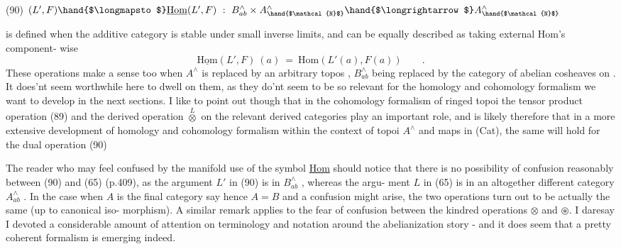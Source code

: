 
(90) \qquad $(L',F)\hand{$\longmapsto$}\underline{\mathrm{Hom}}(L',F) \ :\ B^{\wedge}_{ab} \times A^{\wedge}_{\hand{$\mathcal{N}$}} \hand{$\longrightarrow$} A^{\wedge}_{\hand{$\mathcal{N}$}}$

is defined when the additive category  is stable under small inverse
limits, and can be equally described as taking external Hom's component-%
wise
\[ \underline{\mathrm{Hom}}(L',F)\ (a) \ = \ \mathrm{Hom}(L'(a),F(a)) \qquad . \]
These operations make a sense too when $A^{\wedge}$ is replaced by an arbitrary topos
 , $B^{\wedge}_{ab}$ being replaced by the category of abelian cosheaves on . It
does'nt seem worthwhile here to dwell on them, as they do'nt seem to be
so relevant for the homology and cohomology formalism we want to develop
in the next sections. I like to point out though that in the cohomology
formalism of ringed topoi the tensor product operation (89) and the 
derived operation $\overset{L}{\otimes}$ on the relevant derived categories play an important
role, and  is likely therefore that in a more extensive development of
homology and cohomology formalism within the context of topoi $A^{\wedge}$ and maps
 in (Cat), the same will hold for the dual operation (90) 

The reader
who may feel confused by the manifold use of the symbol \uline{Hom} should notice
that there is no possibility of confusion reasonably between (90) and
(65) (p.409), as the argument $L'$ in (90) is in $B^{\wedge}_{ab}$ , whereas the argu-%
ment $L$ in (65) is in an altogether different category $A^{\wedge}_{ab}$ . In the case
when $A$ is the final category say hence $A=B$ and a confusion might arise,
the two operations turn out to be actually the same (up to canonical iso-%
morphism). A similar remark applies to the fear of confusion between the
kindred operations $\otimes$ and $\circledast$. I daresay I devoted a considerable
amount of attention on terminology and notation around the abelianization
story - and it does seem that a pretty coherent formalism is emerging
indeed.

